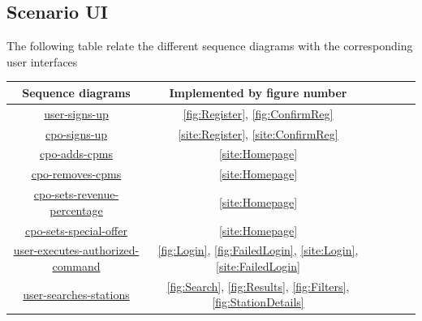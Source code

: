 \subsection{Scenario UI}
The following table relate the different sequence diagrams with the corresponding user interfaces
\begin{table}[H]
    \begin{center}
        \begin{tabular}{|c||c|c|c|c|c|}
            \hline
            Sequence diagrams                                                                                   & Implemented by figure number                                                     \\\hline
            \hyperref[fig:user-signs-up]{user-signs-up}                                                         & \ref{fig:Register}, \ref{fig:ConfirmReg}                                         \\\hline
            \hyperref[fig:cpo-signs-up]{cpo-signs-up}                                                           & \ref{site:Register}, \ref{site:ConfirmReg}                                       \\\hline
            \hyperref[fig:cpo-adds-cpms]{cpo-adds-cpms}                                                         & \ref{site:Homepage}                                                              \\\hline
            \hyperref[fig:cpo-removes-cpms]{cpo-removes-cpms}                                                   & \ref{site:Homepage}                                                              \\\hline
            \hyperref[fig:cpo-sets-revenue-percentage]{cpo-sets-revenue-percentage}                             & \ref{site:Homepage}                                                              \\\hline
            \hyperref[fig:cpo-sets-speciale-offer]{cpo-sets-special-offer}                                      & \ref{site:Homepage}                                                              \\\hline
            \hyperref[fig:user-executes-authorized-command]{user-executes-authorized-command}                   & \ref{fig:Login}, \ref{fig:FailedLogin}, \ref{site:Login}, \ref{site:FailedLogin} \\\hline
            \hyperref[fig:user-searches-stations]{user-searches-stations}                                       & \ref{fig:Search}, \ref{fig:Results}, \ref{fig:Filters}, \ref{fig:StationDetails} \\\hline

\end{tabular}
\end{center}
\end{table}
